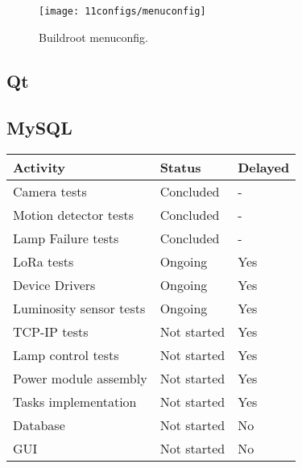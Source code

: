 \begin{figure}[H]
	\centering	
	\texttt{[image: 11configs/menuconfig]}
	\caption{Buildroot menuconfig.}
	\label{fig:menuconfig}
\end{figure}

\subsection{Qt}

\subsection{MySQL}

\begin{table}[H]
	\centering
	\begin{tabular}{|m{8cm}|m{}|m{2cm}|}
		\hline
		\textbf{Activity} & \textbf{Status} & \textbf{Delayed}
		\\\hline\hline
		Camera tests & Concluded & -\\\hline
		Motion detector tests & Concluded & -\\\hline
		Lamp Failure tests & Concluded & -\\\hline
		
		LoRa tests & Ongoing & Yes\\\hline
		Device Drivers & Ongoing & Yes\\\hline
		Luminosity sensor tests & Ongoing & Yes\\\hline
		
		TCP-IP tests & Not started & Yes\\\hline
		Lamp control tests & Not started & Yes\\\hline		
		Power module assembly & Not started & Yes\\\hline
		
		Tasks implementation & Not started & Yes\\\hline
		
		Database & Not started & No\\\hline
		GUI & Not started & No		
		\\\hline
	\end{tabular}
	
\end{table}



